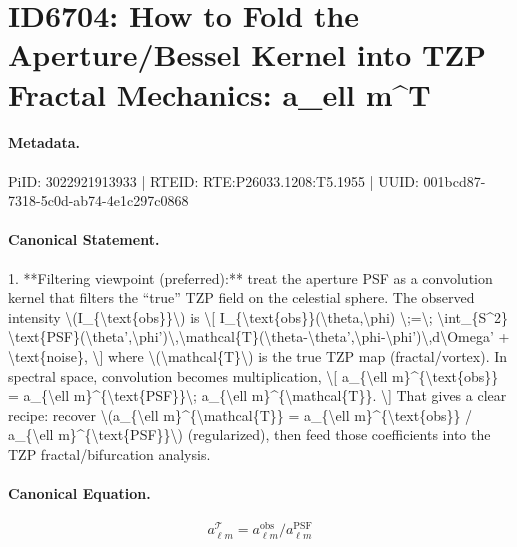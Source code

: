 \section*{ID6704: How to Fold the Aperture/Bessel Kernel into TZP Fractal Mechanics: a\_ell m\textasciicircum{}T}
\paragraph{Metadata.}
PiID: 3022921913933 | RTEID: RTE:P26033.1208:T5.1955 | UUID: 001bcd87-7318-5c0d-ab74-4e1c297c0868

\paragraph{Canonical Statement.}
1. **Filtering viewpoint (preferred):** treat the aperture PSF as a convolution kernel that filters the “true” TZP field on the celestial sphere. The observed intensity \textbackslash{}(I\_\{\textbackslash{}text\{obs\}\}\textbackslash{}) is \textbackslash{}[ I\_\{\textbackslash{}text\{obs\}\}(\textbackslash{}theta,\textbackslash{}phi) \textbackslash{};=\textbackslash{}; \textbackslash{}int\_\{S\textasciicircum{}2\} \textbackslash{}text\{PSF\}(\textbackslash{}theta',\textbackslash{}phi')\textbackslash{},\textbackslash{}mathcal\{T\}(\textbackslash{}theta-\textbackslash{}theta',\textbackslash{}phi-\textbackslash{}phi')\textbackslash{},d\textbackslash{}Omega' + \textbackslash{}text\{noise\}, \textbackslash{}] where \textbackslash{}(\textbackslash{}mathcal\{T\}\textbackslash{}) is the true TZP map (fractal/vortex). In spectral space, convolution becomes multiplication, \textbackslash{}[ a\_\{\textbackslash{}ell m\}\textasciicircum{}\{\textbackslash{}text\{obs\}\} = a\_\{\textbackslash{}ell m\}\textasciicircum{}\{\textbackslash{}text\{PSF\}\}\textbackslash{}; a\_\{\textbackslash{}ell m\}\textasciicircum{}\{\textbackslash{}mathcal\{T\}\}. \textbackslash{}] That gives a clear recipe: recover \textbackslash{}(a\_\{\textbackslash{}ell m\}\textasciicircum{}\{\textbackslash{}mathcal\{T\}\} = a\_\{\textbackslash{}ell m\}\textasciicircum{}\{\textbackslash{}text\{obs\}\} / a\_\{\textbackslash{}ell m\}\textasciicircum{}\{\textbackslash{}text\{PSF\}\}\textbackslash{}) (regularized), then feed those coefficients into the TZP fractal/bifurcation analysis.

\paragraph{Canonical Equation.}
\[
a_{\ell m}^{\mathcal{T}} = a_{\ell m}^{\text{obs}} / a_{\ell m}^{\text{PSF}}
\]

